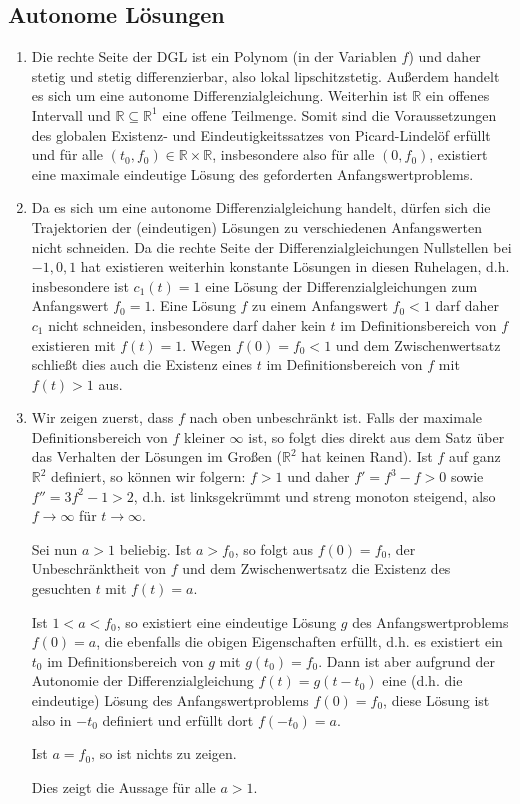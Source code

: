 \documentclass[a4paper]{article}
\begin{document}
\subsection{Autonome Lösungen}
\begin{enumerate}
	\item Die rechte Seite der DGL ist ein Polynom (in der Variablen $f$) und daher stetig und stetig differenzierbar, also lokal lipschitzstetig. Außerdem handelt es sich um eine autonome Differenzialgleichung. Weiterhin ist $\mathds{R}$ ein offenes Intervall und $\mathds{R} \subseteq \mathds{R}^1$ eine offene Teilmenge. Somit sind die Voraussetzungen des globalen Existenz- und Eindeutigkeitssatzes von Picard-Lindelöf erfüllt und für alle $(t_0, f_0) \in \mathds{R} \times \mathds{R}$, insbesondere also für alle $(0, f_0)$, existiert eine maximale eindeutige Lösung des geforderten Anfangswertproblems.
	\item Da es sich um eine autonome Differenzialgleichung handelt, dürfen sich die Trajektorien der (eindeutigen) Lösungen zu verschiedenen Anfangswerten nicht schneiden. Da die rechte Seite der Differenzialgleichungen Nullstellen bei $-1, 0, 1$ hat existieren weiterhin konstante Lösungen in diesen Ruhelagen, d.h. insbesondere ist $c_1(t) = 1$ eine Lösung der Differenzialgleichungen zum Anfangswert $f_0 = 1$. Eine Lösung $f$ zu einem Anfangswert $f_0 < 1$ darf daher $c_1$ nicht schneiden, insbesondere darf daher kein $t$ im Definitionsbereich von $f$ existieren mit $f(t) = 1$. Wegen $f(0) = f_0 < 1$ und dem Zwischenwertsatz schließt dies auch die Existenz eines $t$ im Definitionsbereich von $f$ mit $f(t) > 1$ aus.
	\item Wir zeigen zuerst, dass $f$ nach oben unbeschränkt ist. Falls der maximale Definitionsbereich von $f$ kleiner $\infty$ ist, so folgt dies direkt aus dem Satz über das Verhalten der Lösungen im Großen ($\mathds{R}^2$ hat keinen Rand).
	Ist $f$ auf ganz $\mathds{R}^2$ definiert, so können wir folgern: 
	$f > 1$ und daher $f' = f^3 - f > 0$ sowie $f'' = 3 f^2 - 1 > 2$, d.h. ist linksgekrümmt und streng monoton steigend, also $f \to \infty$ für $t \to \infty$.
	
	Sei nun $a > 1$ beliebig. Ist $a > f_0$, so folgt aus $f(0) = f_0$, der Unbeschränktheit von $f$ und dem Zwischenwertsatz die Existenz des gesuchten $t$ mit $f(t) = a$.

	Ist $1 < a < f_0$, so existiert eine eindeutige Lösung $g$ des Anfangswertproblems $f(0) = a$, die ebenfalls die obigen Eigenschaften erfüllt, d.h. es existiert ein $t_0$ im Definitionsbereich von $g$ mit $g(t_0) = f_0$. Dann ist aber aufgrund der Autonomie der Differenzialgleichung $f(t) = g(t - t_0)$ eine (d.h. die eindeutige) Lösung des Anfangswertproblems $f(0) = f_0$, diese Lösung ist also in $-t_0$ definiert und erfüllt dort $f(-t_0) = a$.

	Ist $a = f_0$, so ist nichts zu zeigen.

	Dies zeigt die Aussage für alle $a > 1$.
\end{enumerate}
\end{document}
